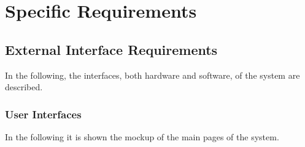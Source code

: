 \chapter{Specific Requirements}

\section{External Interface Requirements}
In the following, the interfaces, both hardware and software, of the system are described.

\subsection{User Interfaces}


In the following it is shown the mockup of the main pages of the system.\\



